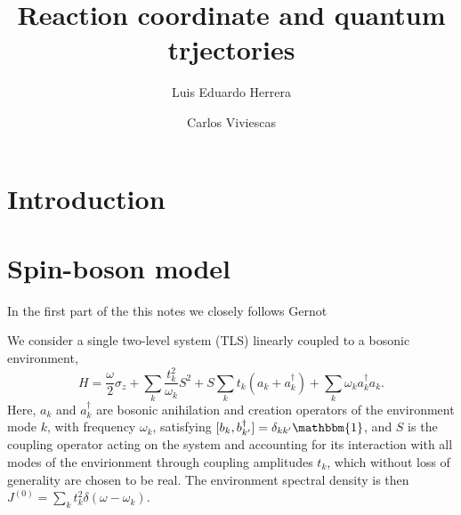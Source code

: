 \documentclass[%
preprint,
onecolumn,
notitlepag,
 amsmath,amssymb,
 aps,
 pra,
]{revtex4-2}
\begin{document}

\title[]{Reaction coordinate and quantum trjectories}

\author{Luis Eduardo Herrera}
\author{Carlos Viviescas}

\begin{abstract}
\end{abstract}
	
\maketitle
%
\section{Introduction}


\section{Spin-boson model}

In the first part of the this notes we closely follows Gernot 

We consider a single two-level system (TLS) linearly coupled to a bosonic environment, 
\begin{equation}
H = \frac{\omega}{2} \sigma_{z}+\sum_{k} \frac{t_{k}^{2}}{\omega_{k}} S^{2}+S \sum_{k} t_{k}\left(a_{k}+a_{k}^{\dagger}\right)+\sum_{k} \omega_{k} a_{k}^{\dagger} a_{k}.
\end{equation}
Here, $a_{k}$ and $a^{\dagger}_{k}$ are bosonic anihilation and creation operators of the environment mode $k$, with frequency $\omega_{k}$, satisfying $[b_{k},b^{\dagger}_{k'}] = \delta_{kk'} \mathbbm{1}$, and $S$ is the coupling operator acting on the system and accounting for its interaction with all modes of the envirionment through coupling amplitudes $t_{k}$, which without loss of generality are chosen to be real. The environment spectral density is then $J^{(0)} = \sum_{k} t_{k}^2 \delta (\omega -  \omega_{k})$.
\end{document}
